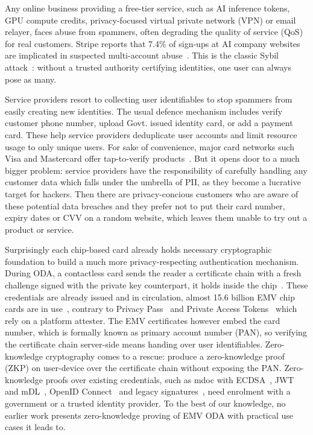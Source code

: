 \documentclass[10pt,a4paper]{article}
\begin{document}
Any online business providing a free-tier service, such as AI inference tokens, GPU compute credits, privacy-focused virtual private network (VPN) or email relayer, faces abuse from spammers, often degrading the quality of service (QoS) for real customers.
Stripe reports that 7.4\% of sign-ups at AI company websites are implicated in suspected multi-account abuse~\cite{stripe-abuse}.
This is the classic Sybil attack~\cite{DBLP:conf/iptps/Douceur02}: without a trusted authority certifying identities, one user can always pose as many.

Service providers resort to collecting user identifiables to stop spammers from easily creating new identities.
The usual defence mechanism includes verify customer phone number, upload Govt. issued identity card, or add a payment card.
These help service providers deduplicate user accounts and limit resource usage to only unique users.
For sake of convenience, major card networks such Visa and Mastercard offer tap-to-verify products~\cite{visa-tap,mc-tap-to-verify}.
But it opens door to a much bigger problem: service providers have the responsibility of carefully handling any customer data which falls under the umbrella of PII, as they become a lucrative target for hackers.
Then there are privacy-concious customers who are aware of these potential data breaches and they prefer not to put their card number, expiry dates or CVV on a random website, which leaves them unable to try out a product or service.

Surprisingly each chip-based card already holds necessary cryptographic foundation to build a much more privacy-respecting authentication mechanism.
During ODA, a contactless card sends the reader a certificate chain with a fresh challenge signed with the private key counterpart, it holds inside the chip~\cite{emv-book2}.
These credentials are already issued and in circulation, almost 15.6 billion EMV chip cards are in use~\cite{emvco-stats}, contrary to Privacy Pass~\cite{privacypass} and Private Access Tokens~\cite{apple-pat} which rely on a platform attester.
The EMV certificates however embed the card number, which is formally known as primary account number (PAN), so verifying the certificate chain server-side means handing over user identifiables.
Zero-knowledge cryptography comes to a rescue: produce a zero-knowledge proof (ZKP) on user-device over the certificate chain without exposing the PAN.
Zero-knowledge proofs over existing credentials, such as mdoc with ECDSA~\cite{DBLP:journals/cic/FrigoS26}, JWT and mDL~\cite{DBLP:journals/iacr/PaquinPZ24}, OpenID Connect~\cite{DBLP:conf/ccs/BaldimtsiC0LMR024} and legacy signatures~\cite{DBLP:conf/sp/WooOSPG25}, need enrolment with a government or a trusted identity provider.
To the best of our knowledge, no earlier work presents zero-knowledge proving of EMV ODA with practical use cases it leads to.
\end{document}
